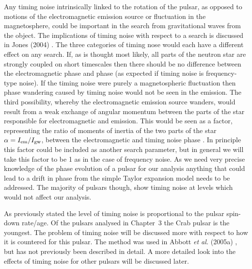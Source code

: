 Any timing noise intrinsically linked to the rotation of the pulsar, as opposed to motions of the
electromagnetic emission source or fluctuation in the magnetosphere, could be important in the
search from gravitational waves from the object. The implications of timing noise with respect to 
a \gw search is discussed in Jones (2004) \cite{Jones:2004}. The three categories of timing nose
would each have a different effect on any search. If, as is thought most likely, all parts of the
neutron star are strongly coupled on short timescales then there should be no difference between the
electromagnetic phase and \gw phase (as expected if timing noise is frequency-type noise). If the
timing noise were purely a magnetospheric fluctuation then phase wandering caused by timing noise
would not be seen in the \gw emission. The third possibility, whereby the electromagnetic emission
source wanders, would result from a weak exchange of angular momentum between the parts of the star
responsible for electromagnetic and \gw emission. This would be seen as a factor, representing the
ratio of moments of inertia of the two parts of the star $\alpha = I_{\rm{em}}/I_{\rm{gw}}$, between
the electromagnetic and \gw timing noise phase \cite{Jones:2004}. In principle this factor could be
included as another search parameter, but in general we will take this factor to be 1 as in the case
of frequency noise. As we need very precise knowledge of the phase evolution of a pulsar for our
analysis anything that could lead to a drift in phase from the simple Taylor expansion model needs
to be addressed. The majority of pulsars though, show timing noise at levels which would not
affect our analysis.

As previously stated the level of timing noise is proportional to the pulsar spin-down rate/age. Of
the pulsars analysed in Chapter~3 the Crab pulsar is the youngest. The problem of timing noise will
be discussed more with respect to how it is countered for this pulsar. The method was used in Abbott
{\it et al.} (2005a) \cite{Abbott:2005}, but has not previously been described in detail. A more
detailed look into the effects of timing noise for other pulsars will be discussed later.

